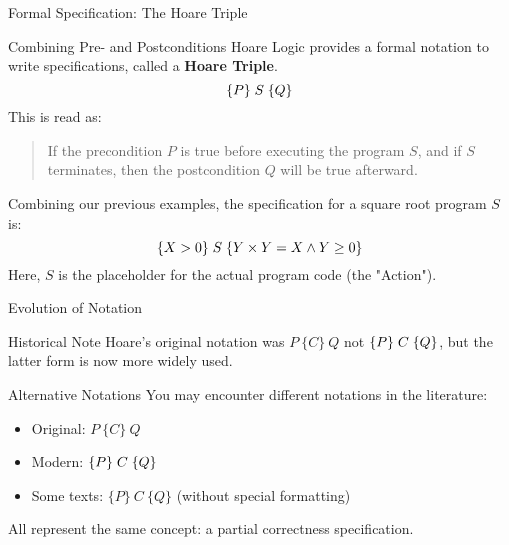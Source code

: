 \begin{frame}{Formal Specification: The Hoare Triple}
    \begin{block}{Combining Pre- and Postconditions}
        Hoare Logic provides a formal notation to write specifications, called a \textbf{Hoare Triple}.
        \[ \{P\}\; S\; \{Q\} \]
        This is read as:
        \begin{quote}
            If the precondition $P$ is true before executing the program $S$, and if $S$ terminates, then the postcondition $Q$ will be true afterward.
        \end{quote}
    \end{block}

    \begin{example}
        Combining our previous examples, the specification for a square root program $S$ is:
        \[ \{X > 0\}\; S\; \{Y \times Y = X \wedge Y \ge 0\} \]
        Here, $S$ is the placeholder for the actual program code (the "Action").
    \end{example}
\end{frame}

\begin{frame}{Evolution of Notation}
    \begin{block}{Historical Note}
        Hoare's original notation was $P\ \{C\}\ Q$ not $\{P\}\; C\; \{Q\}$, but the latter form is now more widely used.
    \end{block}
    
    \begin{block}{Alternative Notations}
        You may encounter different notations in the literature:
        \begin{itemize}
            \item Original: $P\ \{C\}\ Q$
            \item Modern: $\{P\}\; C\; \{Q\}$
            \item Some texts: $\{P\}\ C\ \{Q\}$ (without special formatting)
        \end{itemize}
        All represent the same concept: a partial correctness specification.
    \end{block}
\end{frame}

